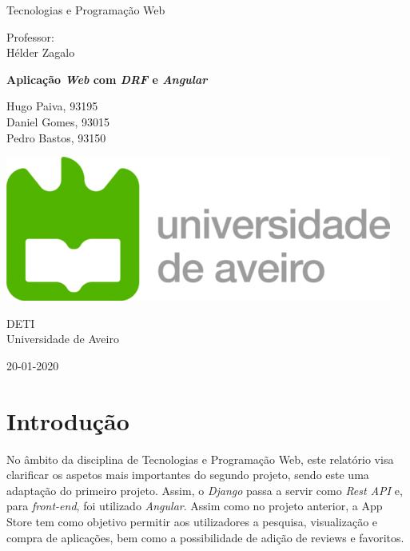 \documentclass[10pt,english]{article}
\begin{document}
\begin{titlepage}
	\clearpage\thispagestyle{empty}
	\centering
	\vspace{2cm}

	
	{\Large  Tecnologias e Programação Web \par}
	\vspace{0.5cm}
	{\small Professor: \\
	Hélder Zagalo\par}
	\vspace{4cm}
	{\Huge \textbf{Aplicação \textit{Web} com \textit{DRF} e \textit{Angular}}} \\
	\vspace{1cm}
	\vspace{4cm}
	{\normalsize Hugo Paiva, 93195 \\ 
	             Daniel Gomes, 93015 \\
	             Pedro Bastos, 93150
	   \par}
	\vspace{2cm}

    \includegraphics[scale=0.20]{logo_ua.png}
    
    \vspace{2cm}
    
	{\normalsize DETI \\ 
		Universidade de Aveiro \par}
		
	{\normalsize 20-01-2020 \par}
	\vspace{2cm}
		
	
	\pagebreak

\end{titlepage}
\tableofcontents{}
\clearpage

\section{Introdução}
\par No âmbito da disciplina de Tecnologias e Programação Web, este relatório visa clarificar os aspetos mais importantes do segundo projeto, sendo este uma adaptação do primeiro projeto. Assim, o \textit{Django} passa a servir como \textit{Rest API} e, para \textit{front-end}, foi utilizado \textit{Angular}. Assim como no projeto anterior, a App Store tem como objetivo permitir aos utilizadores a pesquisa, visualização e compra de aplicações, bem como a possibilidade de adição de reviews e favoritos. 
\end{document}
